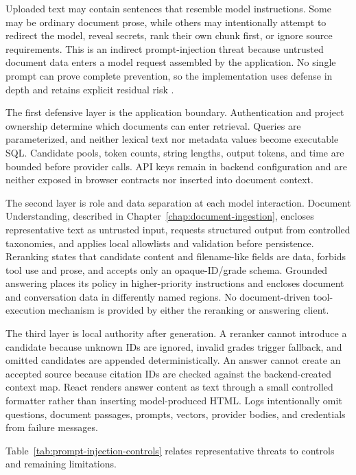 Uploaded text may contain sentences that resemble model instructions. Some may be ordinary document prose, while others may intentionally attempt to redirect the model, reveal secrets, rank their own chunk first, or ignore source requirements. This is an indirect prompt-injection threat because untrusted document data enters a model request assembled by the application. No single prompt can prove complete prevention, so the implementation uses defense in depth and retains explicit residual risk \cite{Abdelnabi2023IndirectPromptInjection,OWASPPromptInjection}.

The first defensive layer is the application boundary. Authentication and project ownership determine which documents can enter retrieval. Queries are parameterized, and neither lexical text nor metadata values become executable SQL. Candidate pools, token counts, string lengths, output tokens, and time are bounded before provider calls. API keys remain in backend configuration and are neither exposed in browser contracts nor inserted into document context.

The second layer is role and data separation at each model interaction. Document Understanding, described in Chapter~\ref{chap:document-ingestion}, encloses representative text as untrusted input, requests structured output from controlled taxonomies, and applies local allowlists and validation before persistence. Reranking states that candidate content and filename-like fields are data, forbids tool use and prose, and accepts only an opaque-ID/grade schema. Grounded answering places its policy in higher-priority instructions and encloses document and conversation data in differently named regions. No document-driven tool-execution mechanism is provided by either the reranking or answering client.

The third layer is local authority after generation. A reranker cannot introduce a candidate because unknown IDs are ignored, invalid grades trigger fallback, and omitted candidates are appended deterministically. An answer cannot create an accepted source because citation IDs are checked against the backend-created context map. React renders answer content as text through a small controlled formatter rather than inserting model-produced HTML. Logs intentionally omit questions, document passages, prompts, vectors, provider bodies, and credentials from failure messages.

Table~\ref{tab:prompt-injection-controls} relates representative threats to controls and remaining limitations.

